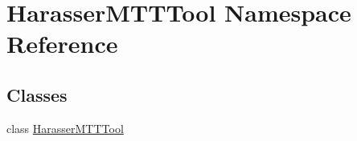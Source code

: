 \hypertarget{namespaceHarasserMTTTool}{\section{Harasser\-M\-T\-T\-Tool Namespace Reference}
\label{namespaceHarasserMTTTool}
}
\subsection*{Classes}
\begin{DoxyCompactItemize}
\item 
class \hyperlink{classHarasserMTTTool_1_1HarasserMTTTool}{Harasser\-M\-T\-T\-Tool}
\end{DoxyCompactItemize}
